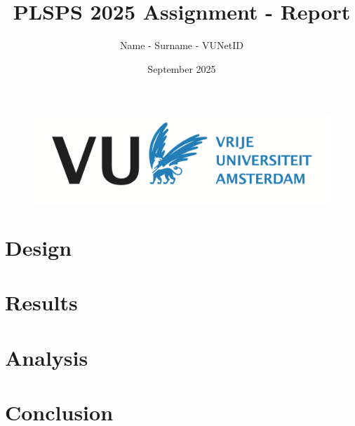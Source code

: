 \documentclass[11pt]{article}
\title{\textbf{PLSPS 2025 Assignment - Report}}
\author{Name - Surname - VUNetID}
\date{September 2025}
\begin{document}
\begin{figure}
\centering
\includegraphics[width=\textwidth]{diagrams/vua.png}
\end{figure}

\maketitle
\tableofcontents

\section{Design}


\section{Results}


\section{Analysis}


\section{Conclusion}



    
\end{document}
